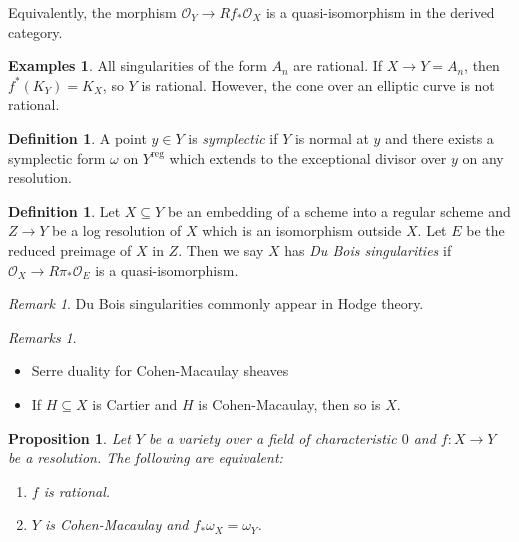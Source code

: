 \documentclass[leqno, openany]{memoir}
\newtheorem{prop}[thm]{Proposition}
\theoremstyle{definition}
\newtheorem{defn}[thm]{Definition}
\newtheorem{exms}[thm]{Examples}
\theoremstyle{remark}
\newtheorem{rmk}[thm]{Remark}
\newtheorem{rmks}[thm]{Remarks}
\theoremstyle{plain}
\theoremstyle{definition}
\theoremstyle{remark}
\newcommand{\mc}[1]{\mathcal{#1}}
\newcommand{\mr}[1]{\mathrm{#1}}
\begin{document}
Equivalently, the morphism $\mc{O}_Y \to R f_* \mc{O}_X$ is a quasi-isomorphism in the derived category.

\begin{exms}
    All singularities of the form $A_n$ are rational. If $X \to Y = A_n$, then $f^*(K_Y) = K_X$, so $Y$ is rational. However, the cone over an elliptic curve is not rational.
\end{exms}

\begin{defn}
    A point $y \in Y$ is \textit{symplectic} if $Y$ is normal at $y$ and there exists a symplectic form $\omega$ on $Y^{\mr{reg}}$ which extends to the exceptional divisor over $y$ on any resolution.
\end{defn}

\begin{defn}
    Let $X \subseteq Y$ be an embedding of a scheme into a regular scheme and $Z \to Y$ be a log resolution of $X$ which is an isomorphism outside $X$. Let $E$ be the reduced preimage of $X$ in $Z$. Then we say $X$ has \textit{Du Bois singularities} if $\mc{O}_X \to R\pi_* \mc{O}_E$ is a quasi-isomorphism.
\end{defn}

\begin{rmk}
    Du Bois singularities commonly appear in Hodge theory.
\end{rmk}

\begin{rmks}\leavevmode
    \begin{itemize}
        \item Serre duality for Cohen-Macaulay sheaves
        \item If $H \subseteq X$ is Cartier and $H$ is Cohen-Macaulay, then so is $X$.
    \end{itemize}
\end{rmks}

\begin{prop}
    Let $Y$ be a variety over a field of characteristic $0$ and $f \colon X \to Y$ be a resolution. The following are equivalent:
    \begin{enumerate}
        \item $f$ is rational.
        \item $Y$ is Cohen-Macaulay and $f_* \omega_X = \omega_Y$.
    \end{enumerate}
\end{prop}
\end{document}
